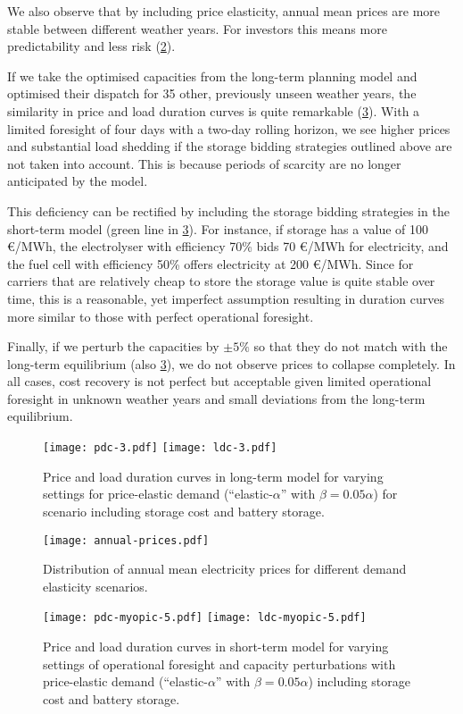 \documentclass[final,3p]{elsarticle}
\begin{document}
We also observe that by including price elasticity, annual mean prices are more
stable between different weather years. For investors this means more
predictability and less risk (\cref{fig:annual-dist}).

If we take the optimised capacities from the long-term planning model and
optimised their dispatch for 35 other, previously unseen weather years, the
similarity in price and load duration curves is quite remarkable
(\cref{fig:myopic}). With a limited foresight of four days with a two-day
rolling horizon, we see higher prices and substantial load shedding if the
storage bidding strategies outlined above are not taken into account. This is
because periods of scarcity are no longer anticipated by the model.

This deficiency can be rectified by including the storage bidding strategies in
the short-term model (green line in \cref{fig:myopic}). For instance, if storage
has a value of 100 \euro{}/MWh, the electrolyser with efficiency 70\% bids 70
\euro{}/MWh for electricity, and the fuel cell with efficiency 50\% offers
electricity at 200 \euro{}/MWh. Since for carriers that are relatively cheap to
store the storage value is quite stable over time, this is a reasonable, yet
imperfect assumption resulting in duration curves more similar to those with
perfect operational foresight.

Finally, if we perturb the capacities by $\pm5\%$ so that they do not match with
the long-term equilibrium (also \cref{fig:myopic}), we do not observe prices to
collapse completely. In all cases, cost recovery is not perfect but acceptable
given limited operational foresight in unknown weather years and small
deviations from the long-term equilibrium.


\begin{figure}
	\centering
	\footnotesize\sffamily
	\texttt{[image: pdc-3.pdf]}
	\texttt{[image: ldc-3.pdf]}
	\caption{Price and load duration curves in long-term model for varying settings for price-elastic demand (``elastic-$\alpha$'' with $\beta=0.05\alpha$) for scenario including storage cost and battery storage.}
	\label{fig:price-duration}
\end{figure}

\begin{figure}
	\centering
	\footnotesize\sffamily
	\texttt{[image: annual-prices.pdf]}
	\caption{Distribution of annual mean electricity prices for different demand elasticity scenarios.}
	\label{fig:annual-dist}
\end{figure}


\begin{figure}
	\centering
	\footnotesize\sffamily
	\texttt{[image: pdc-myopic-5.pdf]}
	\texttt{[image: ldc-myopic-5.pdf]}
	\caption{Price and load duration curves in short-term model for varying settings of operational foresight and capacity perturbations with price-elastic demand (``elastic-$\alpha$'' with $\beta=0.05\alpha$) including storage cost and battery storage.}
	\label{fig:myopic}
\end{figure}

{\normalsize

}
\end{document}
